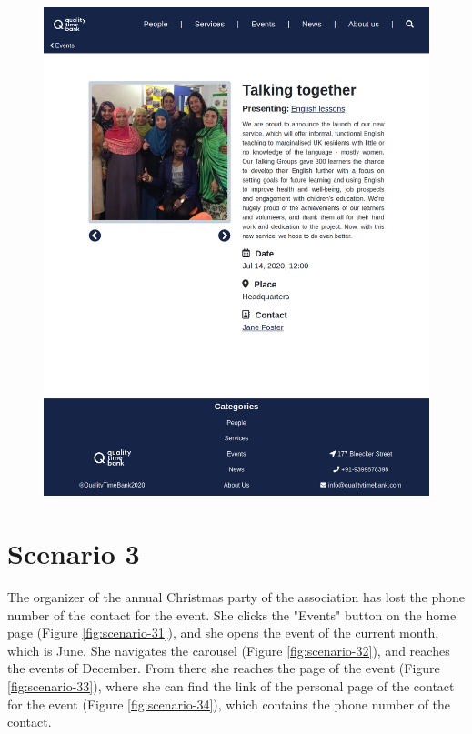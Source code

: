 \documentclass[a4paper, 11pt, parskip=half, headsepline]{scrreprt}
\begin{document}
\begin{figure}[H]
\begin{minipage}[t]{0.5\textwidth}
    	\includegraphics[width=1\linewidth, keepaspectratio]{scenarios/scenario-24}
    	\caption{}
    	\label{fig:scenario-24}
    \end{minipage}
\end{figure}

\section{Scenario 3}

The organizer of the annual Christmas party of the association has lost the phone number of the contact for the event. She clicks the "Events" button on the home page (Figure \ref{fig:scenario-31}), and she opens the event of the current month, which is June. She navigates the carousel (Figure \ref{fig:scenario-32}), and reaches the events of December. From there she reaches the page of the event (Figure \ref{fig:scenario-33}), where she can find the link of the personal page of the contact for the event (Figure \ref{fig:scenario-34}), which contains the phone number of the contact.
\end{document}
